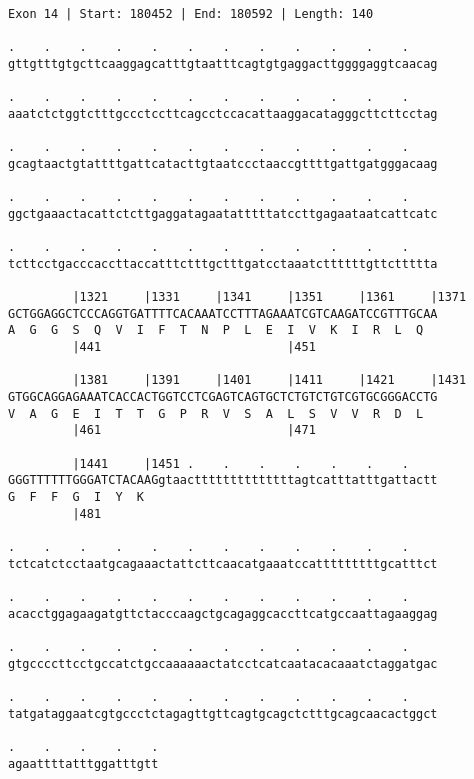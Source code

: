 \documentclass{article}
\begin{document}
\begin{Verbatim}
Exon 14 | Start: 180452 | End: 180592 | Length: 140
 
.    .    .    .    .    .    .    .    .    .    .    .    
gttgtttgtgcttcaaggagcatttgtaatttcagtgtgaggacttggggaggtcaacag
  
.    .    .    .    .    .    .    .    .    .    .    .    
aaatctctggtctttgccctccttcagcctccacattaaggacatagggcttcttcctag
  
.    .    .    .    .    .    .    .    .    .    .    .    
gcagtaactgtattttgattcatacttgtaatccctaaccgttttgattgatgggacaag
  
.    .    .    .    .    .    .    .    .    .    .    .    
ggctgaaactacattctcttgaggatagaatatttttatccttgagaataatcattcatc
  
.    .    .    .    .    .    .    .    .    .    .    .    
tcttcctgacccaccttaccatttctttgctttgatcctaaatcttttttgttcttttta
  
         |1321     |1331     |1341     |1351     |1361     |1371
GCTGGAGGCTCCCAGGTGATTTTCACAAATCCTTTAGAAATCGTCAAGATCCGTTTGCAA
A  G  G  S  Q  V  I  F  T  N  P  L  E  I  V  K  I  R  L  Q  
         |441                          |451                 
  
         |1381     |1391     |1401     |1411     |1421     |1431
GTGGCAGGAGAAATCACCACTGGTCCTCGAGTCAGTGCTCTGTCTGTCGTGCGGGACCTG
V  A  G  E  I  T  T  G  P  R  V  S  A  L  S  V  V  R  D  L  
         |461                          |471                 
  
         |1441     |1451 .    .    .    .    .    .    .    
GGGTTTTTTGGGATCTACAAGgtaacttttttttttttttagtcatttatttgattactt
G  F  F  G  I  Y  K                                         
         |481                                               
  
.    .    .    .    .    .    .    .    .    .    .    .    
tctcatctcctaatgcagaaactattcttcaacatgaaatccatttttttttgcatttct
  
.    .    .    .    .    .    .    .    .    .    .    .    
acacctggagaagatgttctacccaagctgcagaggcaccttcatgccaattagaaggag
  
.    .    .    .    .    .    .    .    .    .    .    .    
gtgccccttcctgccatctgccaaaaaactatcctcatcaatacacaaatctaggatgac
  
.    .    .    .    .    .    .    .    .    .    .    .    
tatgataggaatcgtgccctctagagttgttcagtgcagctctttgcagcaacactggct
  
.    .    .    .    .
agaattttatttggatttgtt
\end{Verbatim}
\end{document}
